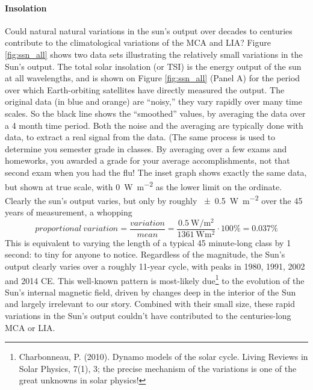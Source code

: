 \paragraph{Insolation}
Could natural natural variations in the sun's output over decades to centuries contribute to the climatological variations of the MCA and LIA? Figure \ref{fig:ssn_all} shows two data sets illustrating the relatively small variations in the Sun's output. The total solar insolation (or TSI) is the energy output of the sun at all wavelengths, and is shown on Figure \ref{fig:ssn_all} (Panel A) for the period over which Earth-orbiting satellites have directly measured the output. The original data (in blue and orange) are ``noisy,'' they vary rapidly over many time scales. So the black line shows the ``smoothed'' values, by averaging the data over a 4 month time period. Both the noise and the averaging are typically done with data, to extract a real signal from the data. (The same process is used to determine you semester grade in classes. By averaging over a few exams and homeworks, you awarded a grade for your average accomplishments, not that second exam when you had the flu! The inset graph shows exactly the same data, but shown at true scale, with \SI{0}{\watt\per\metre\squared} as the lower limit on the ordinate. Clearly the sun's output varies, but only by roughly \SI{\pm 0.5}{\watt\per\metre\squared} over the 45 years of measurement, a whopping
\begin{equation}
	proportional\ variation=\frac{variation}{mean}=\frac{\SI{0.5}{\watt\per\metre\squared}}{\SI{1361}{\watt\metre\squared}}\cdot100\%=0.037\%
\end{equation}
This is equivalent to varying the length of a typical 45 minute-long class by 1 second: to tiny for anyone to notice. Regardless of the magnitude, the Sun's output clearly varies over a roughly 11-year cycle, with peaks in 1980, 1991, 2002 and 2014 CE. This well-known pattern is most-likely due\footnote{Charbonneau, P. (2010). Dynamo models of the solar cycle. Living Reviews in Solar Physics, 7(1), 3; the precise mechanism of the variations is one of the great unknowns in solar physics!} to the evolution of the Sun's internal magnetic field, driven by changes deep in the interior of the Sun and largely irrelevant to our story. Combined with their small size, these rapid variations in the Sun's output couldn't have contributed to the centuries-long MCA or LIA.\\
